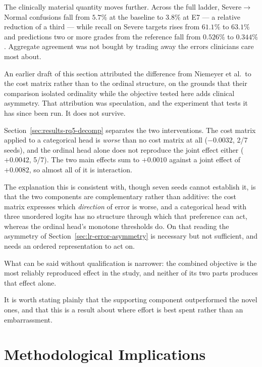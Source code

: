\documentclass[12pt,a4paper]{report}
\begin{document}
The clinically material quantity moves further. Across the full ladder,
Severe$\rightarrow$Normal confusions fall from $5.7\%$ at the baseline to
$3.8\%$ at E7 --- a relative reduction of a third --- while recall on Severe
targets rises from $61.1\%$ to $63.1\%$ and predictions two or more grades from
the reference fall from $0.526\%$ to $0.344\%$. Aggregate agreement was not
bought by trading away the errors clinicians care most about.

An earlier draft of this section attributed the difference from Niemeyer
et al.\ to the cost matrix rather than to the ordinal structure, on the grounds
that their comparison isolated ordinality while the objective tested here adds
clinical asymmetry. That attribution was speculation, and the experiment that
tests it has since been run. It does not survive.

Section~\ref{sec:results-rq5-decomp} separates the two interventions. The cost
matrix applied to a categorical head is \emph{worse} than no cost matrix at all
($-0.0032$, 2/7 seeds), and the ordinal head alone does not reproduce the joint
effect either ($+0.0042$, 5/7). The two main effects sum to $+0.0010$ against a
joint effect of $+0.0082$, so almost all of it is interaction.

The explanation this is consistent with, though seven seeds cannot establish it,
is that the two components are complementary rather than additive: the cost
matrix expresses which \emph{direction} of error is worse, and a categorical
head with three unordered logits has no structure through which that preference
can act, whereas the ordinal head's monotone thresholds do. On that reading the
asymmetry of Section~\ref{sec:lr-error-asymmetry} is necessary but not
sufficient, and needs an ordered representation to act on.

What can be said without qualification is narrower: the combined objective is
the most reliably reproduced effect in the study, and neither of its two parts
produces that effect alone.

It is worth stating plainly that the supporting component outperformed the novel
ones, and that this is a result about where effort is best spent rather than an
embarrassment.

\section{Methodological Implications}
\label{sec:disc-method}
\end{document}
